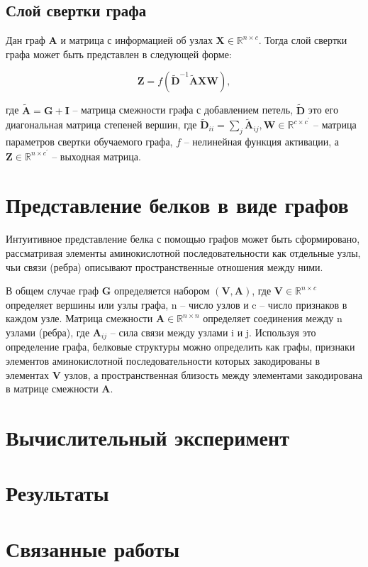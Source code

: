 \documentclass[12pt,twosides]{article}
\begin{document}
	\subsection{Слой свертки графа}
	Дан граф $\mathbf{A}$ и матрица с информацией об узлах $\mathbf{X} \in \mathbb{R}^{n \times c}$. Тогда слой свертки графа может быть представлен в следующей форме:
	
	$$\mathbf{Z}=f\left(\tilde{\mathbf{D}}^{-1} \tilde{\mathbf{A}} \mathbf{X} \mathbf{W}\right),$$
	
	где $\tilde{\mathbf{A}}=\mathbf{G}+\mathbf{I}$ – матрица смежности графа с добавлением петель, $\tilde{\mathbf{D}}$ это его диагональная матрица степеней вершин, где $\tilde{\mathbf{D}}_{i i}=\sum_{j} \tilde{\mathbf{A}}_{i j}, \mathbf{W} \in \mathbb{R}^{c \times c^{\prime}}$ – матрица параметров свертки обучаемого графа, $f$ – нелинейная функция активации, а $\mathbf{Z} \in \mathbb{R}^{n \times c^{\prime}}$ – выходная матрица.
	
	\section{Представление белков в виде графов}
	Интуитивное представление белка с помощью графов может быть сформировано, рассматривая элементы аминокислотной последовательности как отдельные узлы, чьи связи (ребра) описывают пространственные отношения между ними. 
	
	В общем случае граф $\mathbf{G}$ определяется набором $\mathbf{(V, A)}$, где $\mathbf{V}\in \mathbb{R}^{n \times c}$ определяет вершины или узлы графа, n – число узлов и c – число признаков в каждом узле. Матрица смежности $\mathbf{A}\in \mathbb{R}^{n \times n}$ определяет соединения между n узлами (ребра), где $\mathbf{A}_{ij}$ – сила связи между узлами i и j. Используя это определение графа, белковые структуры можно определить как графы, признаки элементов аминокислотной последовательности которых закодированы в элементах $\mathbf{V}$ узлов, а пространственная близость между элементами закодирована в матрице смежности $\mathbf{A}$.

	\section{Вычислительный эксперимент}
	
	\section{Результаты}
	
	\section{Связанные работы}
	

	
	\nocite{*}
	
	
\end{document}

